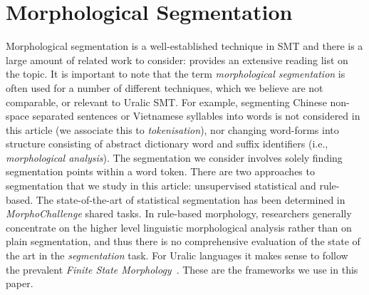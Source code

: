 \documentclass[free]{flammie}
\begin{document}


\section{Morphological Segmentation}
\label{sec:related-work}


Morphological segmentation is a well-established technique in SMT and there is a large amount of related work to consider: \cite[p. 324]{koehn2009statistical} provides an extensive reading list on the topic.
It is important to note that the term \textit{morphological segmentation} is often used for a number of different techniques, which we believe are not comparable, or relevant to Uralic SMT.
For example, segmenting Chinese non-space separated sentences or Vietnamese syllables into words is not considered in this article (we associate this to \textit{tokenisation}), nor changing word-forms into structure consisting of abstract dictionary word and suffix identifiers (i.e., \textit{morphological analysis}).
The segmentation we consider involves solely finding segmentation points within a word token.
There are two approaches to segmentation that we study in this article:
unsupervised statistical and rule-based.
The state-of-the-art of statistical segmentation has been determined in \textit{MorphoChallenge} shared tasks\cite{kurimo2007overview}.
In rule-based morphology, researchers generally concentrate on the higher level linguistic morphological analysis rather than on plain segmentation, and thus there is no comprehensive evaluation of the state of the art in the \textit{segmentation} task.
For Uralic languages it makes sense to follow the prevalent \textit{Finite State Morphology}~\cite{beesley2003finite}. 
These are the frameworks we use in this paper.
\end{document}

